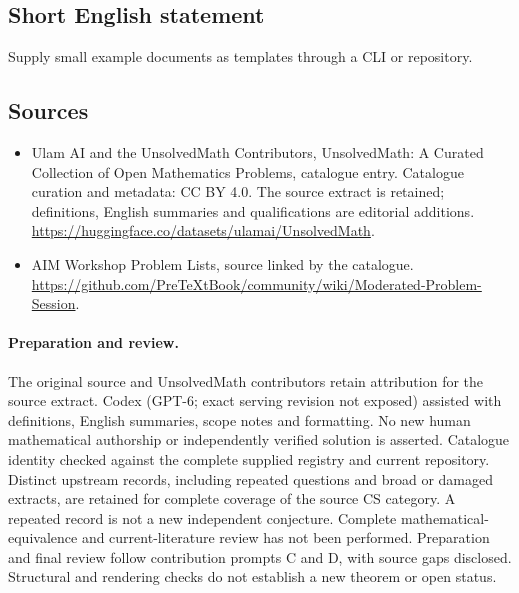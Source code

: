 \documentclass[11pt]{article}
\begin{document}
\subsection{Short English statement}
Supply small example documents as templates through a CLI or repository.
\subsection{Sources}
\begin{itemize}
\item[\hypertarget{source:statement:1}{S1}] Ulam AI and the UnsolvedMath Contributors, UnsolvedMath: A Curated Collection of Open Mathematics Problems, catalogue entry. Catalogue curation and metadata: CC BY 4.0. The source extract is retained; definitions, English summaries and qualifications are editorial additions.
\url{https://huggingface.co/datasets/ulamai/UnsolvedMath}.
\item[\hypertarget{source:statement:2}{S2}] AIM Workshop Problem Lists, source linked by the catalogue.
\url{https://github.com/PreTeXtBook/community/wiki/Moderated-Problem-Session}.
\end{itemize}
\paragraph{Preparation and review.}
The original source and UnsolvedMath contributors retain attribution for the source extract. Codex (GPT-6; exact serving revision not exposed) assisted with definitions, English summaries, scope notes and formatting. No new human mathematical authorship or independently verified solution is asserted. Catalogue identity checked against the complete supplied registry and current repository. Distinct upstream records, including repeated questions and broad or damaged extracts, are retained for complete coverage of the source CS category. A repeated record is not a new independent conjecture. Complete mathematical-equivalence and current-literature review has not been performed. Preparation and final review follow contribution prompts C and D, with source gaps disclosed. Structural and rendering checks do not establish a new theorem or open status.
\label{end:statement}
\end{document}
